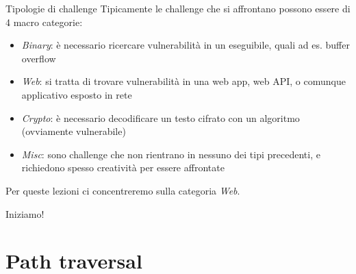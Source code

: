 \documentclass[12pt]{beamer}
\begin{document}
\begin{frame}{Tipologie di challenge}
Tipicamente le challenge che si affrontano possono essere di 4 macro categorie:
\begin{itemize}
    \item \textit{Binary}: è necessario ricercare vulnerabilità in un eseguibile, quali ad es. buffer overflow
    \item \textit{Web}: si tratta di trovare vulnerabilità in una web app, web API, o comunque applicativo esposto in rete
    \item \textit{Crypto}: è necessario decodificare un testo cifrato con un algoritmo (ovviamente vulnerabile)
    \item \textit{Misc}: sono challenge che non rientrano in nessuno dei tipi precedenti, e richiedono spesso creatività per essere affrontate
\end{itemize}

Per queste lezioni ci concentreremo sulla categoria \textit{Web}.
\end{frame}

\begin{frame}
\Huge\center Iniziamo!
\end{frame}

\section{Path traversal}
\end{document}
